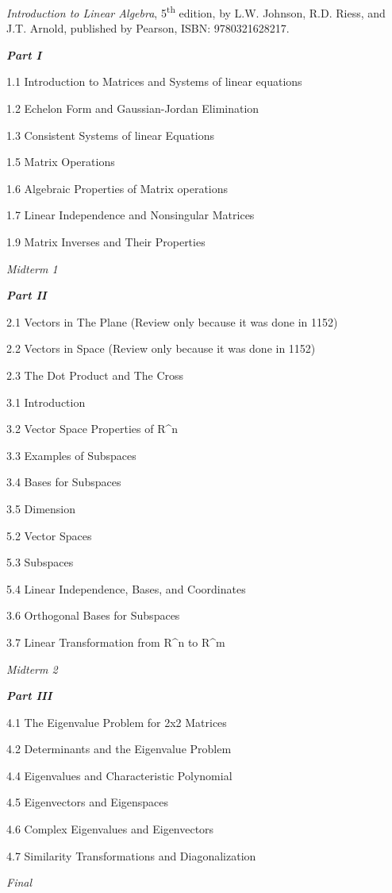 \documentclass{osucourse}
\begin{document}
\CatalogDescription
\PrerequisitesAndExclusions

\begin{Text}
\emph{Introduction to Linear Algebra}, 5\textsuperscript{th} edition, by L.W. Johnson,
R.D. Riess, and J.T. Arnold, published by Pearson, ISBN: 9780321628217.
\end{Text}

\begin{TopicsOutline}
\textbf{\emph{Part I}}

1.1 Introduction to Matrices and Systems of linear equations

1.2 Echelon Form and Gaussian-Jordan Elimination

1.3 Consistent Systems of linear Equations

1.5 Matrix Operations

1.6 Algebraic Properties of Matrix operations

1.7 Linear Independence and Nonsingular Matrices

1.9 Matrix Inverses and Their Properties

\emph{Midterm 1}

\textbf{\emph{Part II}}

2.1 Vectors in The Plane (Review only because it was done in 1152)

2.2 Vectors in Space (Review only because it was done in 1152)

2.3 The Dot Product and The Cross

3.1 Introduction

3.2 Vector Space Properties of R\^{}n

3.3 Examples of Subspaces

3.4 Bases for Subspaces

3.5 Dimension

5.2 Vector Spaces

5.3 Subspaces

5.4 Linear Independence, Bases, and Coordinates

3.6 Orthogonal Bases for Subspaces

3.7 Linear Transformation from R\^{}n to R\^{}m

\emph{Midterm 2}

\textbf{\emph{Part III}}

4.1 The Eigenvalue Problem for 2x2 Matrices

4.2 Determinants and the Eigenvalue Problem

4.4 Eigenvalues and Characteristic Polynomial

4.5 Eigenvectors and Eigenspaces

4.6 Complex Eigenvalues and Eigenvectors

4.7 Similarity Transformations and Diagonalization

\emph{Final}
\end{TopicsOutline}
\end{document}

